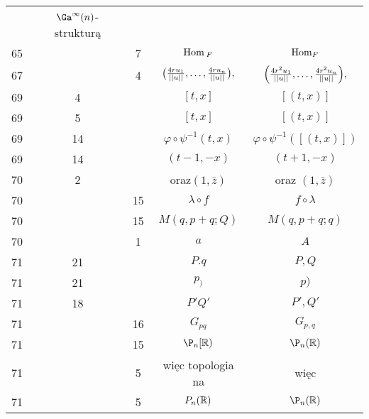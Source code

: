 \documentclass[a4paper,11pt]{article}
\begin{document}
\begin{center}
\begin{tabular}{|c|c|c|c|c|}
           & $\Ga^{ \infty }( n )$-strukturą \\
    65  & &  7 & $\textrm{Hom}_{ \: F }$ & $\textrm{Hom}_{ F }$ \\
    67  & &  4 & $\big( \frac{ 4 r u_{ 1 } }{ \left|\left|  u  \right|\right| }, \ldots,
                 \frac{ 4 r u_{ n } }{ \left|\left|  u  \right|\right| } \big),$
           & $\left( \frac{ 4 r^{ 2 } u_{ 1 } }{ \left|\left|  u  \right|\right| }, \ldots,
             \frac{ 4 r^{ 2 } u_{ n } }{ \left|\left|  u  \right|\right| } \right)\! ,$ \\
    69  &  4 & & $[ t, x ]$ & $[ ( t, x ) ]$ \\
    69  &  5 & & $[ t, x ]$ & $[ ( t, x ) ]$ \\
    69  & 14 & & $\varphi \circ \psi^{ -1 }( t, x )$
           & $\varphi \circ \psi^{ -1 }( [ ( t, x ) ] )$ \\
    69  & 14 & & $( t - 1, -x )$ & $( t + 1, -x )$ \\
    70  &  2 & & oraz$( 1, \bar{ z } )$ & oraz $( 1, \bar{ z } )$ \\
    70  & & 15 & $\lambda \circ f$ & $f \circ \lambda$ \\
    70  & & 15 & $M( q, p + q; Q )$ & $M( q, p + q; q )$ \\
    70  & &  1 & $a$ & $A$ \\
    71  & 21 & & $P.q$ & $P, Q$ \\
    71  & 21 & & $p_{ ) }$ & $p )$ \\
    71  & 18 & & $P' Q'$ & $P', Q'$ \\
    71  & & 16 & $G_{ pq }$ & $G_{ p, q }$ \\
    71  & & 15 & $\P_{ n }[ \Rb )$ & $\P_{ n }( \Rb )$ \\
    71  & &  5 & więc topologia na & więc \\
    71  & &  5 & $P_{ n }( \mathbb{R} )$ & $\P_{ n }( \Rb )$ \\
    \hline
  \end{tabular}


\end{center}
\end{document}
